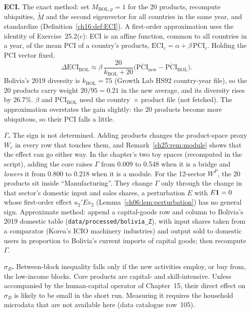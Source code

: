 \documentclass[../solutions_manual.tex]{subfiles}
\begin{document}
 \textbf{ECI.} The exact method: set $M_{\text{BOL},p} = 1$ for the 20 products, recompute ubiquities, $\tilde M$ and the second eigenvector for all countries in the same year, and standardize (Definition~\ref{ch16:def:ECI}). A first-order approximation uses the identity of Exercise~25.2(c): ECI is an affine function, common to all countries in a year, of the mean PCI of a country's products, $\text{ECI}_c = \alpha + \beta\,\overline{\text{PCI}}_c$. Holding the PCI vector fixed,
\[
\Delta\text{ECI}_{\text{BOL}} \approx \beta\,\frac{20}{k_{\text{BOL}} + 20}\bigl(\overline{\text{PCI}}_{\text{new}} - \overline{\text{PCI}}_{\text{BOL}}\bigr).
\]
Bolivia's 2019 diversity is $k_{\text{BOL}} = 75$ (Growth Lab HS92 country-year file), so the 20 products carry weight $20/95 = 0.21$ in the new average, and its diversity rises by 26.7\%. $\beta$ and $\overline{\text{PCI}}_{\text{BOL}}$ need the country~$\times$ product file (not fetched). The approximation overstates the gain slightly: the 20 products become more ubiquitous, so their PCI falls a little.

 \textbf{$\Gamma$.} The sign is not determined. Adding products changes the product-space proxy $W_c$ in every row that touches them, and Remark~\ref{ch25:rem:module} shows that the effect can go either way. In the chapter's two toy spaces (recomputed in the script), adding the core raises $\Gamma$ from 0.009 to 0.548 when it is a bridge and \emph{lowers} it from 0.800 to 0.218 when it is a module. For the 12-sector $W^P$, the 20 products sit inside ``Manufacturing''. They change $\Gamma$ only through the change in that sector's domestic input and sales shares, a perturbation $E$ with $E\mathbf{1} = 0$ whose first-order effect $u_2'Ev_2$ (Lemma~\ref{ch06:lem:perturbation}) has no general sign. Approximate method: append a capital-goods row and column to Bolivia's 2019 domestic table (\texttt{data/processed/bolivia\_Z}), with input shares taken from a comparator (Korea's ICIO machinery industries) and output sold to domestic users in proportion to Bolivia's current imports of capital goods; then recompute $\Gamma$.

 \textbf{$\sigma_B$.} Between-block inequality falls only if the new activities employ, or buy from, the low-income blocks. Core products are capital- and skill-intensive. Unless accompanied by the human-capital operator of Chapter~15, their direct effect on $\sigma_B$ is likely to be small in the short run. Measuring it requires the household microdata that are not available here (data catalogue row~105).
\end{document}
